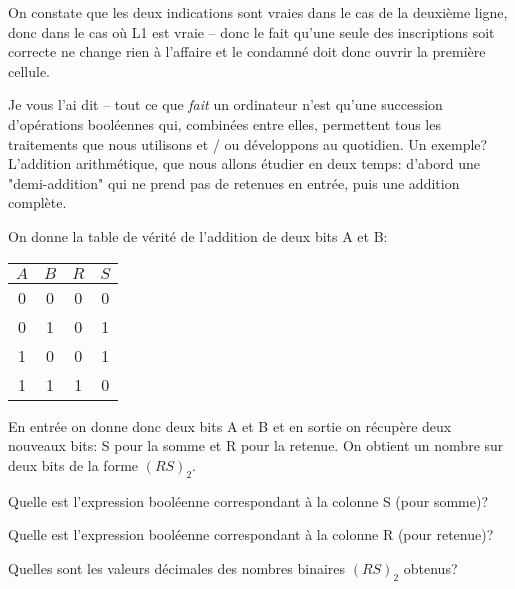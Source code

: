 \documentclass[12pt]{article}
\begin{document}
\begin{MaReponse}
\begin{alphenum}
			\item On constate que les deux indications sont vraies dans le cas de la deuxième ligne, donc dans le cas où L1 est vraie -- donc le fait qu'une seule des inscriptions soit correcte ne change rien à l'affaire et le condamné doit donc ouvrir la première cellule.
			
		\end{alphenum}
	\end{MaReponse}
	
	Je vous l'ai dit -- tout ce que \textit{fait} un ordinateur n'est qu'une succession d'opérations booléennes qui, combinées entre elles, permettent tous les traitements que nous utilisons et / ou développons au quotidien. Un exemple? L'addition arithmétique, que nous allons étudier en deux temps: d'abord une "demi-addition" qui ne prend pas de retenues en entrée, puis une addition complète.
	
	\begin{MonExo}
		On donne la table de vérité de l'addition de deux bits A et B:
		\vspace{0.5cm}
		\begin{center}		
			\begin{tabular}{|c|c|c|c|}
				\hline
				$A$ & $B$ & $R$ & $S$ \\ \hline
				0 & 0 & 0 & 0 \\ \hline
				0 & 1 & 0 & 1 \\ \hline
				1 & 0 & 0 & 1 \\ \hline
				1 & 1 & 1 & 0 \\ \hline
			\end{tabular}
		\end{center}
		\vspace{0.5cm}
		En entrée on donne donc deux bits A et B et en sortie on récupère deux nouveaux bits: S pour la somme et R pour la retenue. On obtient un nombre sur deux bits de la forme $(RS)_{2}$.
		\begin{alphenum}
			\item Quelle est l’expression booléenne correspondant à la colonne S (pour somme)?
			\item Quelle est l’expression booléenne correspondant à la colonne R (pour retenue)?
			\item Quelles sont les valeurs décimales des nombres binaires $(RS)_{2}$ obtenus?
		\end{alphenum}
	\end{MonExo}
\end{document}
